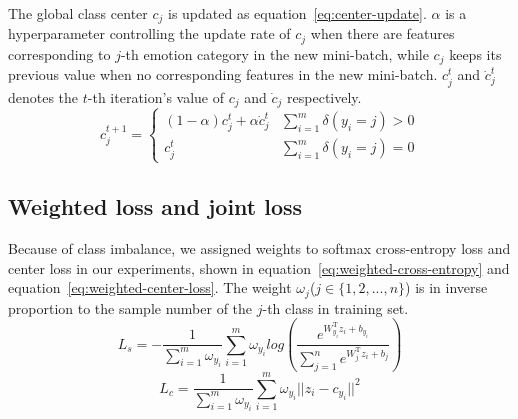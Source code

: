 \documentclass{article}
\begin{document}
The global class center $c_j$ is updated as equation~\ref{eq:center-update}. $\alpha$ is a hyperparameter controlling the update rate of $c_j$ when there are features corresponding to $j$-th emotion category in the new mini-batch, while $c_j$ keeps its previous value when no corresponding features in the new mini-batch. $c^t_j$ and $\dot{c}^t_j$ denotes the $t$-th iteration's value of  $c_j$ and $\dot{c}_j$ respectively.
\begin{equation} \label{eq:center-update}
c_j^{t+1}=\left\{
\begin{array}{lr}
(1 - \alpha) c_j^t + \alpha \dot{c}^t_j & \sum_{i=1}^{m}\delta(y_i = j) > 0 \\
c_j^t & \sum_{i=1}^{m}\delta(y_i = j) = 0
\end{array}
\right.
\end{equation}
\subsection{Weighted loss and joint loss}

Because of class imbalance, we assigned weights to softmax cross-entropy loss and center loss in our experiments, shown in equation~\ref{eq:weighted-cross-entropy} and equation~\ref{eq:weighted-center-loss}. The weight $\omega_j$($j \in \{1, 2, ... , n\}$)  is  in inverse proportion to the sample number of the $j$-th class in training set.
\begin{equation} \label{eq:weighted-cross-entropy}
L_s = - \frac{1}{\sum_{i=1}^{m}\omega_{y_i}}\sum_{i=1}^{m}{\omega_{y_i}log(\frac{e^{W_{y_i}^\mathrm{T}z_i+b_{y_i}}}{\sum_{j=1}^{n}e^{W_j^\mathrm{T}z_i+b_j}})}
\end{equation}
\begin{equation} \label{eq:weighted-center-loss}
L_c=\frac{1}{\sum_{i=1}^{m}\omega_{y_i}}\sum_{i=1}^{m}{\omega_{y_i}||z_i - c_{y_i}||^2}
\end{equation}
\end{document}
